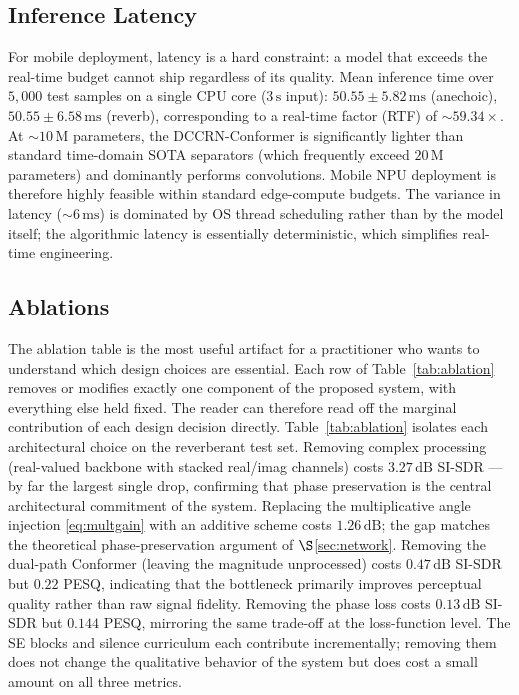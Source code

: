 \documentclass[journal,10pt]{IEEEtran}
\begin{document}
\subsection{Inference Latency}
For mobile deployment, latency is a hard constraint: a model that exceeds the real-time budget cannot ship regardless of its quality. Mean inference time over \(5{,}000\) test samples on a single CPU core (\(3\,\mathrm{s}\) input): \(50.55\pm 5.82\,\mathrm{ms}\) (anechoic), \(50.55\pm 6.58\,\mathrm{ms}\) (reverb), corresponding to a real-time factor (RTF) of \(\sim\!59.34\!\times\). At \(\sim\!10\,\mathrm{M}\) parameters, the DCCRN-Conformer is significantly lighter than standard time-domain SOTA separators (which frequently exceed \(20\,\mathrm{M}\) parameters) and dominantly performs convolutions. Mobile NPU deployment is therefore highly feasible within standard edge-compute budgets. The variance in latency (\(\sim\!6\,\mathrm{ms}\)) is dominated by OS thread scheduling rather than by the model itself; the algorithmic latency is essentially deterministic, which simplifies real-time engineering.

\subsection{Ablations}
The ablation table is the most useful artifact for a practitioner who wants to understand which design choices are essential. Each row of Table~\ref{tab:ablation} removes or modifies exactly one component of the proposed system, with everything else held fixed. The reader can therefore read off the marginal contribution of each design decision directly. Table~\ref{tab:ablation} isolates each architectural choice on the reverberant test set. Removing complex processing (real-valued backbone with stacked real/imag channels) costs \(3.27\,\mathrm{dB}\) SI-SDR --- by far the largest single drop, confirming that phase preservation is the central architectural commitment of the system. Replacing the multiplicative angle injection \eqref{eq:multgain} with an additive scheme costs \(1.26\,\mathrm{dB}\); the gap matches the theoretical phase-preservation argument of \(\S\)\ref{sec:network}. Removing the dual-path Conformer (leaving the magnitude unprocessed) costs \(0.47\,\mathrm{dB}\) SI-SDR but \(0.22\) PESQ, indicating that the bottleneck primarily improves perceptual quality rather than raw signal fidelity. Removing the phase loss costs \(0.13\,\mathrm{dB}\) SI-SDR but \(0.144\) PESQ, mirroring the same trade-off at the loss-function level. The SE blocks and silence curriculum each contribute incrementally; removing them does not change the qualitative behavior of the system but does cost a small amount on all three metrics.
\end{document}
